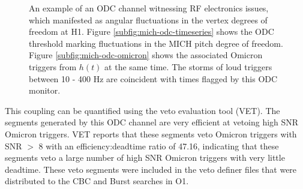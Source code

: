 \begin{figure}[ht!]%

\caption[ODC threshold on MICH pitch]{%
         An example of an ODC channel witnessing RF electronics issues, which %
         manifested as angular fluctuations in the vertex degrees of freedom %
         at H1. Figure \ref{subfig:mich-odc-timeseries} shows the ODC threshold %
         marking fluctuations in the MICH pitch degree of freedom. Figure %
         \ref{subfig:mich-odc-omicron} shows the associated Omicron triggers from %
         $h(t)$ at the same time. The storms of loud triggers between 10 - 400 Hz %
         are coincident with times flagged by this ODC monitor.}
\end{figure}\label{fig:mich-odc-example}

This coupling can be quantified using the veto evaluation tool (VET). The 
segments generated by this ODC channel are very efficient at vetoing high SNR 
Omicron triggers. VET reports that these segments veto Omicron triggers with SNR 
$>$ 8 with an efficiency:deadtime ratio of 47.16, indicating that these segments 
veto a large number of high SNR Omicron triggers with very little deadtime. These 
veto segments were included in the veto definer files that were distributed to 
the CBC and Burst searches in O1. 

